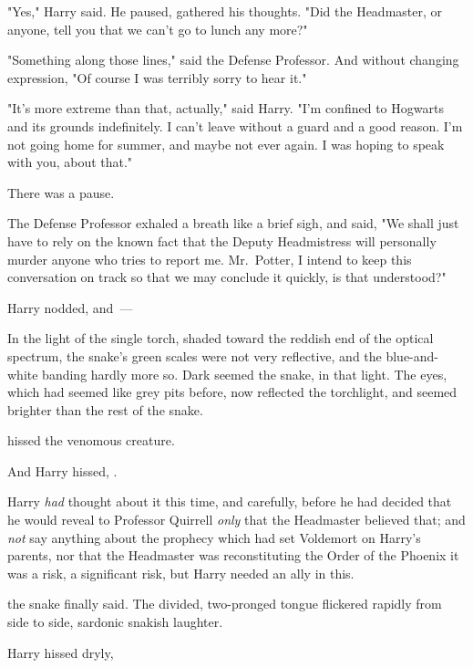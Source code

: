 "Yes," Harry said. He paused, gathered his thoughts. "Did the Headmaster, or
anyone, tell you that we can't go to lunch any more?"

"Something along those lines," said the Defense Professor. And without changing
expression, "Of course I was terribly sorry to hear it."

"It's more extreme than that, actually," said Harry. "I'm confined to Hogwarts
and its grounds indefinitely. I can't leave without a guard and a good reason.
I'm not going home for summer, and maybe not ever again. I was hoping{\el}
to speak with you, about that."

There was a pause.

The Defense Professor exhaled a breath like a brief sigh, and said, "We shall
just have to rely on the known fact that the Deputy Headmistress will
personally murder anyone who tries to report me. Mr.~Potter, I intend to keep
this conversation on track so that we may conclude it quickly, is that
understood?"

Harry nodded, and~---

In the light of the single torch, shaded toward the reddish end of the optical
spectrum, the snake's green scales were not very reflective, and the
blue-and-white banding hardly more so. Dark seemed the snake, in that light.
The eyes, which had seemed like grey pits before, now reflected the torchlight,
and seemed brighter than the rest of the snake.

 hissed the venomous creature. 

And Harry hissed, .

Harry \emph{had} thought about it this time, and carefully, before he had
decided that he would reveal to Professor Quirrell \emph{only} that the
Headmaster believed that; and \emph{not} say anything about the prophecy which
had set Voldemort on Harry's parents, nor that the Headmaster was
reconstituting the Order of the Phoenix{\el} it was a risk, a significant
risk, but Harry needed an ally in this.

 the snake finally said. The divided,
two-pronged tongue flickered rapidly from side to side, sardonic snakish
laughter. 

 Harry hissed dryly, 

